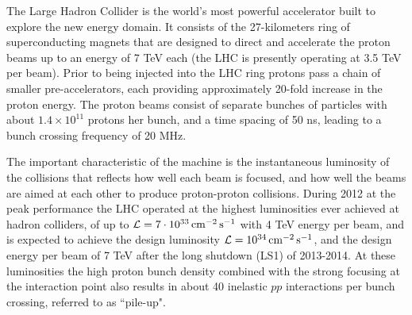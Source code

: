 The Large Hadron Collider is the world's most powerful accelerator
built to explore the new energy domain.  It consists of the
27-kilometers ring of superconducting magnets that are designed to
direct and accelerate the proton beams up to an energy of 7 TeV each
(the LHC is presently operating at 3.5 TeV per beam). Prior to being
injected into the LHC ring protons pass a chain of smaller
pre-accelerators, each providing approximately 20-fold increase in the
proton energy.
The proton beams consist of separate bunches of particles with about $1.4 
\times 10^{11}$ 
protons her bunch, and a time spacing of 50 ns, leading to a bunch 
crossing frequency of 20 MHz. 

The important characteristic of the machine is the instantaneous 
luminosity of the collisions
that reflects how well each beam is focused, and how well the
beams are aimed at each other to produce proton-proton collisions.
During 2012 at the peak performance the LHC operated at the highest
luminosities ever achieved at hadron colliders, of up 
to ${\cal L} = 7 \cdot 10^{33} \,\mathrm{cm}^{-2}\, \mathrm{s}^{-1}$ with 
4 TeV energy per beam, and is expected to achieve the design luminosity 
${\cal L} = 10^{34} \,\mathrm{cm}^{-2} \,\mathrm{s}^{-1}$, and the design 
energy per beam of 7 TeV
after the long shutdown (LS1) of 2013-2014. At these luminosities 
the high proton bunch density combined with the strong focusing at the 
interaction point also results 
in about 40 inelastic $pp$ interactions per bunch crossing, referred to as 
``pile-up". 

